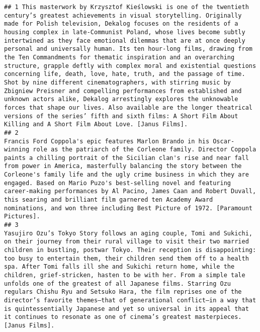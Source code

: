 \documentclass[
]{article}
\begin{document}
\begin{verbatim}
## 1 This masterwork by Krzysztof Kieślowski is one of the twentieth century’s greatest achievements in visual storytelling. Originally made for Polish television, Dekalog focuses on the residents of a housing complex in late-Communist Poland, whose lives become subtly intertwined as they face emotional dilemmas that are at once deeply personal and universally human. Its ten hour-long films, drawing from the Ten Commandments for thematic inspiration and an overarching structure, grapple deftly with complex moral and existential questions concerning life, death, love, hate, truth, and the passage of time. Shot by nine different cinematographers, with stirring music by Zbigniew Preisner and compelling performances from established and unknown actors alike, Dekalog arrestingly explores the unknowable forces that shape our lives. Also available are the longer theatrical versions of the series’ fifth and sixth films: A Short Film About Killing and A Short Film About Love. [Janus Films].
## 2                                                                                                                                                                                                                                                                                                                                                                                          Francis Ford Coppola's epic features Marlon Brando in his Oscar-winning role as the patriarch of the Corleone family. Director Coppola paints a chilling portrait of the Sicilian clan's rise and near fall from power in America, masterfully balancing the story between the Corleone's family life and the ugly crime business in which they are engaged. Based on Mario Puzo's best-selling novel and featuring career-making performances by Al Pacino, James Caan and Robert Duvall, this searing and brilliant film garnered ten Academy Award nominations, and won three including Best Picture of 1972. [Paramount Pictures].
## 3                                                                                                                                                                                                                                    Yasujiro Ozu’s Tokyo Story follows an aging couple, Tomi and Sukichi, on their journey from their rural village to visit their two married children in bustling, postwar Tokyo. Their reception is disappointing: too busy to entertain them, their children send them off to a health spa. After Tomi falls ill she and Sukichi return home, while the children, grief-stricken, hasten to be with her. From a simple tale unfolds one of the greatest of all Japanese films. Starring Ozu regulars Chishu Ryu and Setsuko Hara, the film reprises one of the director’s favorite themes—that of generational conflict—in a way that is quintessentially Japanese and yet so universal in its appeal that it continues to resonate as one of cinema’s greatest masterpieces. [Janus Films].

\end{verbatim}
\end{document}
